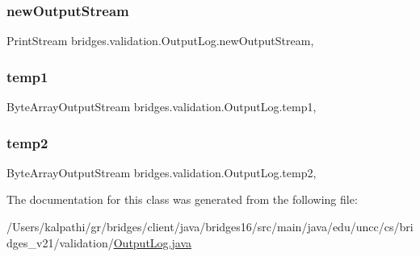 \hypertarget{classbridges_1_1validation_1_1_output_log_acf8b19de1738e70f12eba5854b9e01b4}{}\label{classbridges_1_1validation_1_1_output_log_acf8b19de1738e70f12eba5854b9e01b4} 
\subsubsection{\texorpdfstring{new\+Output\+Stream}{newOutputStream}}
{\footnotesize\ttfamily Print\+Stream bridges.\+validation.\+Output\+Log.\+new\+Output\+Stream\hspace{0.3cm}{\ttfamily [static]}, {\ttfamily [protected]}}

\hypertarget{classbridges_1_1validation_1_1_output_log_a142611812dd1ea095c4a1274bd40a93a}{}\label{classbridges_1_1validation_1_1_output_log_a142611812dd1ea095c4a1274bd40a93a} 
\subsubsection{\texorpdfstring{temp1}{temp1}}
{\footnotesize\ttfamily Byte\+Array\+Output\+Stream bridges.\+validation.\+Output\+Log.\+temp1\hspace{0.3cm}{\ttfamily [static]}, {\ttfamily [protected]}}

\hypertarget{classbridges_1_1validation_1_1_output_log_ab1f0ab7e9ada60f29c4c4f59694c1163}{}\label{classbridges_1_1validation_1_1_output_log_ab1f0ab7e9ada60f29c4c4f59694c1163} 
\subsubsection{\texorpdfstring{temp2}{temp2}}
{\footnotesize\ttfamily Byte\+Array\+Output\+Stream bridges.\+validation.\+Output\+Log.\+temp2\hspace{0.3cm}{\ttfamily [static]}, {\ttfamily [protected]}}



The documentation for this class was generated from the following file\+:\begin{DoxyCompactItemize}
\item 
/\+Users/kalpathi/gr/bridges/client/java/bridges16/src/main/java/edu/uncc/cs/bridges\+\_\+v21/validation/\hyperlink{_output_log_8java}{Output\+Log.\+java}\end{DoxyCompactItemize}
